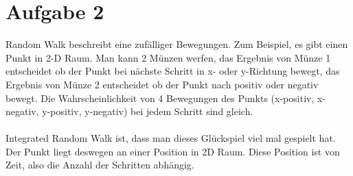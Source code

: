 \section{Aufgabe 2}
Random Walk beschreibt eine zufälliger Bewegungen. Zum Beispiel, es gibt einen Punkt in 2-D Raum. Man kann 2 Münzen werfen, das Ergebnis von Münze 1 entscheidet ob der Punkt bei nächste Schritt in x- oder y-Richtung bewegt, das Ergebnis von Münze 2 entscheidet ob der Punkt nach positiv oder negativ bewegt. Die Wahrscheinlichkeit von 4 Bewegungen des Punkts (x-positiv, x-negativ, y-positiv, y-negativ) bei jedem Schritt sind gleich.\\\\
Integrated Random Walk ist, dass man dieses Glückspiel viel mal gespielt hat. Der Punkt liegt deswegen an einer Position in 2D Raum. Diese Position ist von Zeit, also die Anzahl der Schritten abhängig. 
\clearpage
